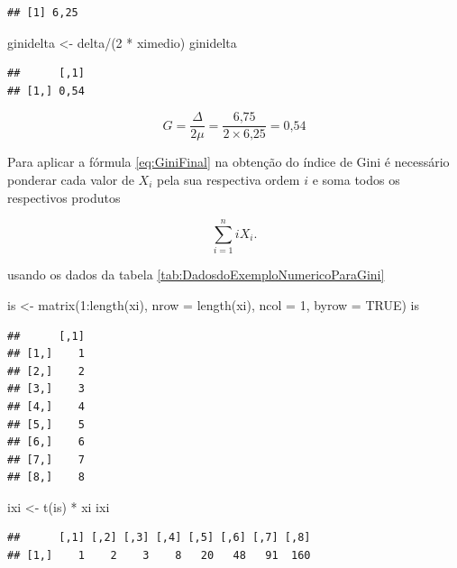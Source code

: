 \documentclass[
]{book}
\newenvironment{Shaded}{\begin{snugshade}}{\end{snugshade}}
\newcommand{\AttributeTok}[1]{\textcolor[rgb]{0.77,0.63,0.00}{#1}}
\newcommand{\ConstantTok}[1]{\textcolor[rgb]{0.00,0.00,0.00}{#1}}
\newcommand{\DecValTok}[1]{\textcolor[rgb]{0.00,0.00,0.81}{#1}}
\newcommand{\FunctionTok}[1]{\textcolor[rgb]{0.00,0.00,0.00}{#1}}
\newcommand{\NormalTok}[1]{#1}
\newcommand{\OtherTok}[1]{\textcolor[rgb]{0.56,0.35,0.01}{#1}}
\newcommand{\SpecialCharTok}[1]{\textcolor[rgb]{0.00,0.00,0.00}{#1}}
\begin{document}
\begin{verbatim}
## [1] 6,25
\end{verbatim}

\begin{Shaded}
\begin{Highlighting}[]
\NormalTok{ginidelta }\OtherTok{\textless{}{-}}\NormalTok{ delta}\SpecialCharTok{/}\NormalTok{(}\DecValTok{2} \SpecialCharTok{*}\NormalTok{ ximedio)}
\NormalTok{ginidelta}
\end{Highlighting}
\end{Shaded}

\begin{verbatim}
##      [,1]
## [1,] 0,54
\end{verbatim}

\[
  G = \dfrac{\Delta}{2\mu} = \dfrac{\text{6,75}}{2 \times \text{6,25}} = \text{0,54}
\]

Para aplicar a fórmula \eqref{eq:GiniFinal} na obtenção do índice de Gini é necessário ponderar cada valor de \(X_i\) pela sua respectiva ordem \(i\) e soma todos os respectivos produtos

\[
  \sum_{i=1}^{n}iX_i.
\]

usando os dados da tabela \ref{tab:DadosdoExemploNumericoParaGini}

\begin{Shaded}
\begin{Highlighting}[]
\NormalTok{is }\OtherTok{\textless{}{-}} \FunctionTok{matrix}\NormalTok{(}\DecValTok{1}\SpecialCharTok{:}\FunctionTok{length}\NormalTok{(xi), }\AttributeTok{nrow =} \FunctionTok{length}\NormalTok{(xi), }\AttributeTok{ncol =} \DecValTok{1}\NormalTok{, }
    \AttributeTok{byrow =} \ConstantTok{TRUE}\NormalTok{)}
\NormalTok{is}
\end{Highlighting}
\end{Shaded}

\begin{verbatim}
##      [,1]
## [1,]    1
## [2,]    2
## [3,]    3
## [4,]    4
## [5,]    5
## [6,]    6
## [7,]    7
## [8,]    8
\end{verbatim}

\begin{Shaded}
\begin{Highlighting}[]
\NormalTok{ixi }\OtherTok{\textless{}{-}} \FunctionTok{t}\NormalTok{(is) }\SpecialCharTok{*}\NormalTok{ xi}
\NormalTok{ixi}
\end{Highlighting}
\end{Shaded}

\begin{verbatim}
##      [,1] [,2] [,3] [,4] [,5] [,6] [,7] [,8]
## [1,]    1    2    3    8   20   48   91  160
\end{verbatim}
\end{document}
